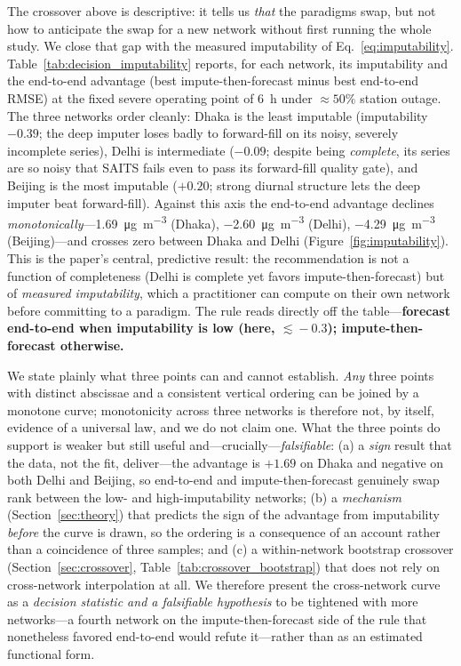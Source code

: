 \documentclass[review,3p,times]{elsarticle}
\newcommand{\ugm}{\si{\micro\gram\per\cubic\metre}}
\begin{document}
The crossover above is descriptive: it tells us \emph{that} the paradigms swap,
but not how to anticipate the swap for a new network without first running the
whole study. We close that gap with the measured imputability of
Eq.~\eqref{eq:imputability}. Table~\ref{tab:decision_imputability} reports, for
each network, its imputability and the end-to-end advantage (best
impute-then-forecast minus best end-to-end RMSE) at the fixed severe operating
point of \SI{6}{\hour} under $\approx\!50\%$ station outage. The three networks
order cleanly: Dhaka is the least imputable (imputability $-0.39$; the deep
imputer loses badly to forward-fill on its noisy, severely incomplete series),
Delhi is intermediate ($-0.09$; despite being \emph{complete}, its series are so
noisy that SAITS fails even to pass its forward-fill quality gate), and Beijing
is the most imputable ($+0.20$; strong diurnal structure lets the deep imputer
beat forward-fill). Against this axis the end-to-end advantage declines
\emph{monotonically}---\SI{+1.69}{\ugm} (Dhaka), \SI{-2.60}{\ugm} (Delhi),
\SI{-4.29}{\ugm} (Beijing)---and crosses zero between Dhaka and Delhi
(Figure~\ref{fig:imputability}). This is the paper's central, predictive result:
the recommendation is not a function of completeness (Delhi is complete yet
favors impute-then-forecast) but of \emph{measured imputability}, which a
practitioner can compute on their own network before committing to a paradigm.
The rule reads directly off the table---\textbf{forecast end-to-end when
imputability is low (here, $\lesssim\!-0.3$); impute-then-forecast otherwise.}

We state plainly what three points can and cannot establish. \emph{Any} three
points with distinct abscissae and a consistent vertical ordering can be joined
by a monotone curve; monotonicity across three networks is therefore not, by
itself, evidence of a universal law, and we do not claim one. What the three
points do support is weaker but still useful and---crucially---\emph{falsifiable}:
(a) a \emph{sign} result that the data, not the fit, deliver---the advantage is
$+1.69$ on Dhaka and negative on both Delhi and Beijing, so end-to-end and
impute-then-forecast genuinely swap rank between the low- and high-imputability
networks; (b) a \emph{mechanism} (Section~\ref{sec:theory}) that predicts the
sign of the advantage from imputability \emph{before} the curve is drawn, so the
ordering is a consequence of an account rather than a coincidence of three
samples; and (c) a within-network bootstrap crossover
(Section~\ref{sec:crossover}, Table~\ref{tab:crossover_bootstrap}) that does not
rely on cross-network interpolation at all. We therefore present the
cross-network curve as a \emph{decision statistic and a falsifiable hypothesis}
to be tightened with more networks---a fourth network on the
impute-then-forecast side of the rule that nonetheless favored end-to-end would
refute it---rather than as an estimated functional form.
\end{document}

